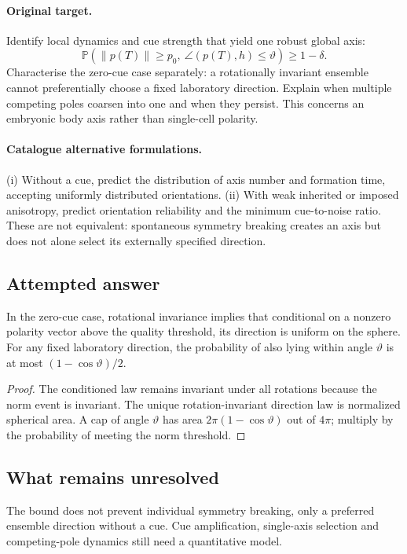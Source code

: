 \documentclass[11pt]{article}
\begin{document}
\paragraph{Original target.}
Identify local dynamics and cue strength that yield one robust global axis:
\[
\mathbb{P}\!\left(\|p(T)\|\geq p_0,\ \angle(p(T),h)\leq\vartheta\right)\geq1-\delta.
\]
Characterise the zero-cue case separately: a rotationally invariant ensemble cannot preferentially choose a fixed laboratory direction. Explain when multiple competing poles coarsen into one and when they persist. This concerns an embryonic body axis rather than single-cell polarity.
\paragraph{Catalogue alternative formulations.}
(i) Without a cue, predict the distribution of axis number and formation time, accepting uniformly distributed orientations. (ii) With weak inherited or imposed anisotropy, predict orientation reliability and the minimum cue-to-noise ratio. These are not equivalent: spontaneous symmetry breaking creates an axis but does not alone select its externally specified direction.
\subsection{Attempted answer}
\begin{proposition}
In the zero-cue case, rotational invariance implies that conditional on a nonzero polarity vector above the quality threshold, its direction is uniform on the sphere. For any fixed laboratory direction, the probability of also lying within angle $\vartheta$ is at most $(1-\cos\vartheta)/2$.
\end{proposition}
\begin{proof}
The conditioned law remains invariant under all rotations because the norm event is invariant. The unique rotation-invariant direction law is normalized spherical area. A cap of angle $\vartheta$ has area $2\pi(1-\cos\vartheta)$ out of $4\pi$; multiply by the probability of meeting the norm threshold.
\end{proof}
\subsection{What remains unresolved}
The bound does not prevent individual symmetry breaking, only a preferred ensemble direction without a cue. Cue amplification, single-axis selection and competing-pole dynamics still need a quantitative model.
\end{document}

